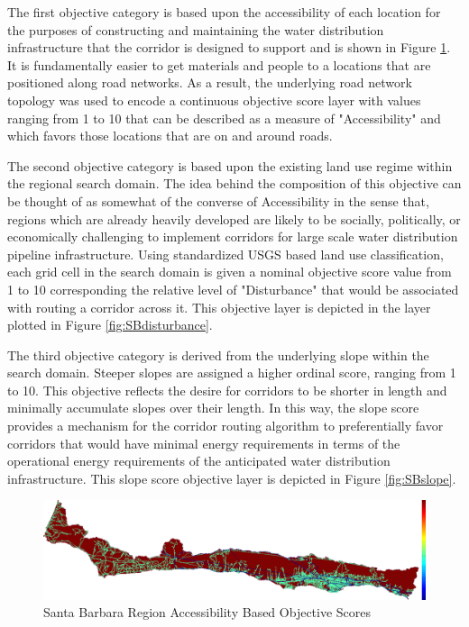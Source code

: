 The first objective category is based upon the accessibility of each location for the purposes of constructing and maintaining the water distribution infrastructure that the corridor is designed to support and is shown in Figure \ref{fig:SBaccessibility}. It is fundamentally easier to get materials and people to a locations that are positioned along road networks. As a result, the underlying road network topology was used to encode a continuous objective score layer with values ranging from 1 to 10 that can be described as a measure of "Accessibility" and which favors those locations that are on and around roads.

The second objective category is based upon the existing land use regime within the regional search domain. The idea behind the composition of this objective can be thought of as somewhat of the converse of Accessibility in the sense that, regions which are already heavily developed are likely to be socially, politically, or economically challenging to implement corridors for large scale water distribution pipeline infrastructure. Using standardized USGS based land use classification, each grid cell in the search domain is given a nominal objective score value from 1 to 10  corresponding the relative level of "Disturbance" that would be associated with routing a corridor across it. This objective layer is depicted in the layer plotted in Figure \ref{fig:SBdisturbance}.

The third objective category is derived from the underlying slope within the search domain. Steeper slopes are assigned a higher ordinal score, ranging from 1 to 10. This objective reflects the desire for corridors to be shorter in length and minimally accumulate slopes over their length. In this way, the slope score provides a mechanism for the corridor routing algorithm to preferentially favor corridors that would have minimal energy requirements in terms of the operational energy requirements of the anticipated water distribution infrastructure. This slope score objective layer is depicted in Figure \ref{fig:SBslope}. 

        \begin{figure}[!h]
            \begin{center}
            \includegraphics[width=5.5in]{figures/SantaBarbara_AccessibilityScore.png}   
            \caption{Santa Barbara Region Accessibility Based Objective Scores}
            \label{fig:SBaccessibility}
            \end{center}
        \end{figure} 

